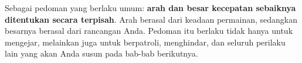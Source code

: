 \begin{catatabox}
Sebagai pedoman yang berlaku umum: \textbf{arah dan besar kecepatan sebaiknya
ditentukan secara terpisah}. Arah berasal dari keadaan permainan, sedangkan
besarnya berasal dari rancangan Anda. Pedoman itu berlaku tidak hanya untuk
mengejar, melainkan juga untuk berpatroli, menghindar, dan seluruh perilaku
lain yang akan Anda susun pada bab-bab berikutnya.
\end{catatabox}
